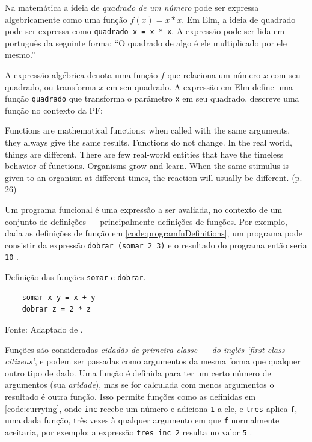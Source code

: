 Na matemática a ideia de \emph{quadrado de um número} pode ser expressa
algebricamente como uma função \(f(x)=x*x\).
Em Elm, a ideia de quadrado pode ser expressa como \texttt{quadrado x = x * x}.
A expressão pode ser lida em português da seguinte forma: “O quadrado de algo
é ele multiplicado por ele mesmo.”

A expressão algébrica denota uma função \(f\) que relaciona um número \(x\) com
seu quadrado, ou transforma \(x\) em seu quadrado.
A expressão em Elm define uma função \texttt{quadrado} que transforma o
parâmetro \texttt{x} em seu quadrado.
\textcite{roy2009} descreve uma função no contexto da PF:

\begin{citacao}
  Functions are mathematical functions: when called with the same arguments,
  they always give the same results. Functions do not change. In the real world,
  things are different. There are few real-world entities that have the timeless
  behavior of functions. Organisms grow and learn. When the same stimulus is
  given to an organism at different times, the reaction will usually be
  different. (p. 26)
\end{citacao}

Um programa funcional é uma expressão a ser avaliada, no contexto de um
conjunto de definições — principalmente definições de funções.
Por exemplo, dada as definições de função em \ref{code:programfnDefinitions}, um
programa pode consistir da expressão \texttt{dobrar (somar 2 3)} e o resultado
do programa então seria \texttt{10} \cite{noble1994}.

\begin{listing}[H]
  \centering
  \caption{Definição das funções \texttt{somar} e \texttt{dobrar}.}
  \begin{verbatim}
    somar x y = x + y
    dobrar z = 2 * z
  \end{verbatim}
  \small Fonte: Adaptado de \textcite{noble1994}.
  \label{code:programfnDefinitions}
\end{listing}

Funções são consideradas \emph{cidadãs de primeira classe — do inglês ‘first-class
citizens’}, e podem ser passadas como argumentos da mesma forma que qualquer
outro tipo de dado.
Uma função é definida para ter um certo número de argumentos (sua \emph{aridade}),
mas se for calculada com menos argumentos o resultado é outra função.
Isso permite funções como as definidas em \ref{code:currying}, onde \texttt{inc} recebe
um número e adiciona \texttt{1} a ele, e \texttt{tres} aplica \texttt{f}, uma dada função, três
vezes à qualquer argumento em que \texttt{f} normalmente aceitaria, por exemplo: a
expressão \texttt{tres inc 2} resulta no valor \texttt{5} \cite{noble1994}.

